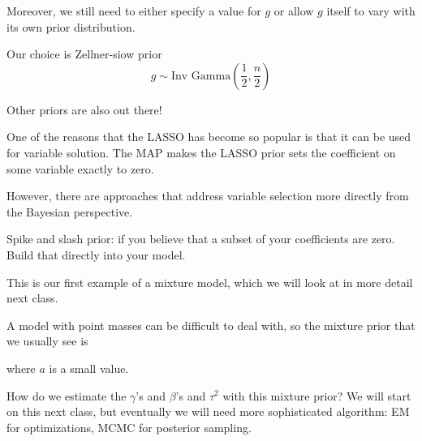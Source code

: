 Moreover, we still need to either specify a value for $g$ or allow $g$ itself to vary with its own prior distribution.

Our choice is Zellner-siow prior 
\[
g \sim \text{Inv Gamma}(\frac{1}{2}, \frac{n}{2})
\]

Other priors are also out there!

One of the reasons that the LASSO has become so popular is that it can be used for variable solution. The MAP makes the LASSO prior sets the coefficient on some variable exactly to zero.

However, there are approaches that address variable selection more directly from the Bayesian perspective.

Spike and slash prior: if you believe that a subset of your coefficients are zero. Build that directly into your model.

This is our first example of a mixture model, which we will look at in more detail next class.

A model with point masses can be difficult to deal with, so the mixture prior that we usually see is 

where $a$ is a small value.

How do we estimate the $\gamma$'s and $\beta$'s and $\tau^2$ with this mixture prior? We will start on this next class, but eventually we will need more sophisticated algorithm: EM for optimizations, MCMC for posterior sampling. 